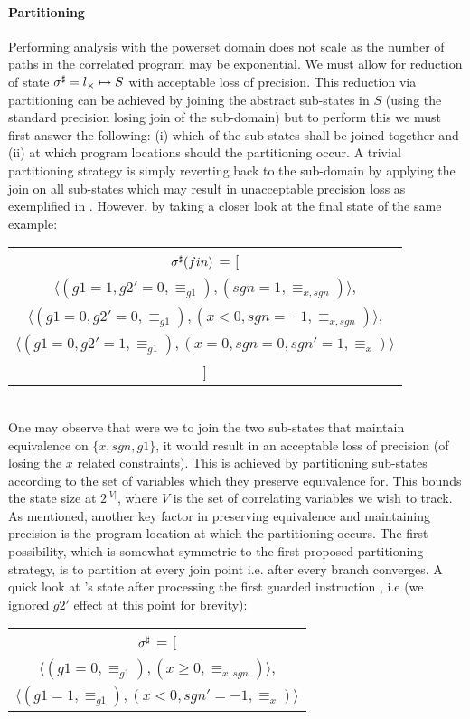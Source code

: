\paragraph{Partitioning}
Performing analysis with the powerset domain does not scale as the number of paths in the correlated program may be exponential. We must allow for reduction of state $\sigma^\sharp = l_{\times} \mapsto S$ with acceptable loss of precision. This reduction via partitioning can be achieved by joining the abstract sub-states in $S$ (using the standard precision losing join of the sub-domain) but to perform this we must first answer the following: (i) which of the sub-states shall be joined together and (ii) at which program locations should the partitioning occur. A trivial partitioning strategy is simply reverting back to the sub-domain by applying the join on all sub-states which may result in unacceptable precision loss as exemplified in . However, by taking a closer look at the final state of the same example:
\\
\begin{tabular}{c}
$\sigma^\sharp(fin)$ = [
\\
$\langle (g1=1,g2'=0,\equiv_{g1}),(sgn=1,\equiv_{x,sgn}) \rangle$,
\\
$\langle (g1=0,g2'=0,\equiv_{g1}), (x<0,sgn=-1,\equiv_{x,sgn}) \rangle$,
\\
$\langle (g1=0,g2'=1,\equiv_{g1}),(x=0,sgn=0,sgn'=1,\equiv_{x}) \rangle$
\\
]
\end{tabular}
\\
One may observe that were we to join the two sub-states that maintain equivalence on $\{x,sgn,g1\}$, it would result in an acceptable loss of precision (of losing the $x$ related constraints). This is achieved by partitioning sub-states according to the set of variables which they preserve equivalence for. This bounds the state size at $2^{|V|}$, where $V$ is the set of correlating variables we wish to track. 
As mentioned, another key factor in preserving equivalence and maintaining precision is the program location at which the partitioning occurs. The first possibility, which is somewhat symmetric to the first proposed partitioning strategy, is to partition at every join point i.e. after every branch converges. A quick look at 's state after processing the first guarded instruction , i.e (we ignored $g2'$ effect at this point for brevity):
\\
\begin{tabular}{c}
$\sigma^\sharp$ = [ 
\\
$\langle (g1=0,\equiv_{g1}),(x \geq 0,\equiv_{x,sgn}) \rangle$,
\\
$\langle (g1=1,\equiv_{g1}),(x < 0,sgn' = -1, \equiv_{x}) \rangle$
\\
\end{tabular}
